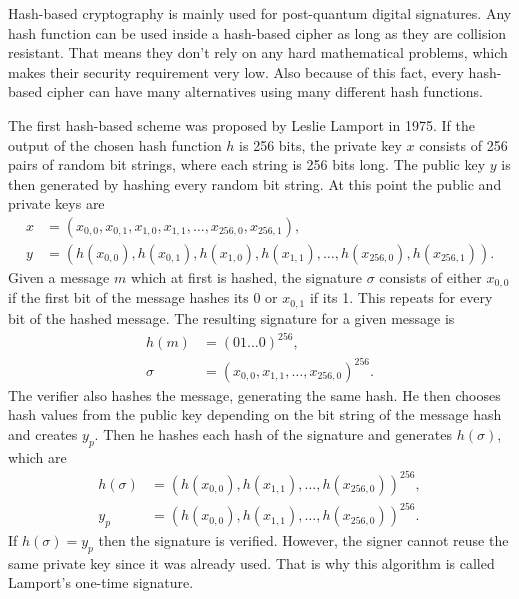 Hash-based cryptography is mainly used for post-quantum digital signatures. Any hash function can be used inside a hash-based cipher as long as they are collision resistant. That means they don't rely on any hard mathematical problems, which makes their security requirement very low. Also because of this fact, every hash-based cipher can have many alternatives using many different hash functions. \cite{Bernstein2009}

The first hash-based scheme was proposed by Leslie Lamport in 1975. If the output of the chosen hash function $h$ is 256 bits, the private key $x$ consists of 256 pairs of random bit strings, where each string is 256 bits long. The public key $y$ is then generated by hashing every random bit string. At this point the public and private keys are
\begin{align}
  x & =(x_{0,0}, x_{0,1}, x_{1,0}, x_{1,1},\dots,x_{256, 0},x_{256, 1}),                   \\
  y & =(h(x_{0,0}), h(x_{0,1}), h(x_{1,0}), h(x_{1,1}),\dots,h(x_{256, 0}),h(x_{256, 1})).
\end{align}
Given a message $m$ which at first is hashed, the signature $\sigma$ consists of either $x_{0,0}$ if the first bit of the message hashes its 0 or $x_{0,1}$ if its 1. This repeats for every bit of the hashed message. The resulting signature for a given message is
\begin{align}
  h(m)   & =(01\dots0)^{256},                           \\
  \sigma & =(x_{0,0}, x_{1,1}, \dots, x_{256,0})^{256}.
\end{align}
The verifier also hashes the message, generating the same hash. He then chooses hash values from the public key depending on the bit string of the message hash and creates $y_p$. Then he hashes each hash of the signature and generates $h(\sigma)$, which are
\begin{align}
  h(\sigma) & =(h(x_{0,0}), h(x_{1,1}), \dots, h(x_{256,0}))^{256}, \\
  y_p       & =(h(x_{0,0}), h(x_{1,1}), \dots, h(x_{256,0}))^{256}.
\end{align}
If $h(\sigma)=y_p$ then the signature is verified. However, the signer cannot reuse the same private key since it was already used. That is why this algorithm is called Lamport's one-time signature. \cite{Bernstein149}

